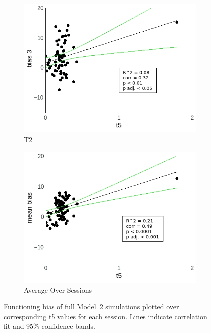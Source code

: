 \documentclass[a4paper]{scrreprt}
\begin{document}
\begin{figure}
\begin{subfigure}[b]{0.49\textwidth}
        \includegraphics[width=\textwidth]{figs/sec3/t5/t5_diff_3_mod2mod2.jpeg}
        \caption{T2}
    \end{subfigure}
    \begin{subfigure}[b]{0.49\textwidth}
        \includegraphics[width=\textwidth]{figs/sec3/t5/t5_diff_mean_mod2mod2.jpeg}
        \caption{Average Over Sessions}
    \end{subfigure}
\caption{Functioning bias of full Model~2 simulations plotted over corresponding t5 values for each session. Lines indicate correlation fit and 95\% confidence bands.}
\label{fig:t5_diff_mod2mod2}
\end{figure}
\end{document}

